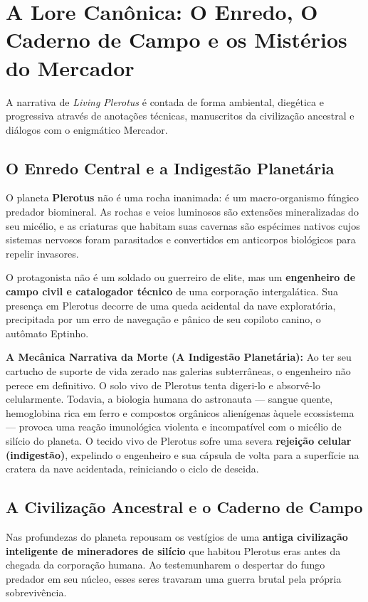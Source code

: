 \documentclass[a4paper,12pt]{report}
\begin{document}
\section{A Lore Canônica: O Enredo, O Caderno de Campo e os Mistérios do Mercador}

A narrativa de \textit{Living Plerotus} é contada de forma ambiental, diegética e progressiva através de anotações técnicas, manuscritos da civilização ancestral e diálogos com o enigmático Mercador.

\subsection{O Enredo Central e a Indigestão Planetária}
O planeta \textbf{Plerotus} não é uma rocha inanimada: é um macro-organismo fúngico predador biomineral. As rochas e veios luminosos são extensões mineralizadas do seu micélio, e as criaturas que habitam suas cavernas são espécimes nativos cujos sistemas nervosos foram parasitados e convertidos em anticorpos biológicos para repelir invasores.

O protagonista não é um soldado ou guerreiro de elite, mas um \textbf{engenheiro de campo civil e catalogador técnico} de uma corporação intergalática. Sua presença em Plerotus decorre de uma queda acidental da nave exploratória, precipitada por um erro de navegação e pânico de seu copiloto canino, o autômato Eptinho.

\textbf{A Mecânica Narrativa da Morte (A Indigestão Planetária):} Ao ter seu cartucho de suporte de vida zerado nas galerias subterrâneas, o engenheiro não perece em definitivo. O solo vivo de Plerotus tenta digeri-lo e absorvê-lo celularmente. Todavia, a biologia humana do astronauta --- sangue quente, hemoglobina rica em ferro e compostos orgânicos alienígenas àquele ecossistema --- provoca uma reação imunológica violenta e incompatível com o micélio de silício do planeta. O tecido vivo de Plerotus sofre uma severa \textbf{rejeição celular (indigestão)}, expelindo o engenheiro e sua cápsula de volta para a superfície na cratera da nave acidentada, reiniciando o ciclo de descida.

\subsection{A Civilização Ancestral e o Caderno de Campo}
Nas profundezas do planeta repousam os vestígios de uma \textbf{antiga civilização inteligente de mineradores de silício} que habitou Plerotus eras antes da chegada da corporação humana. Ao testemunharem o despertar do fungo predador em seu núcleo, esses seres travaram uma guerra brutal pela própria sobrevivência.
\end{document}
